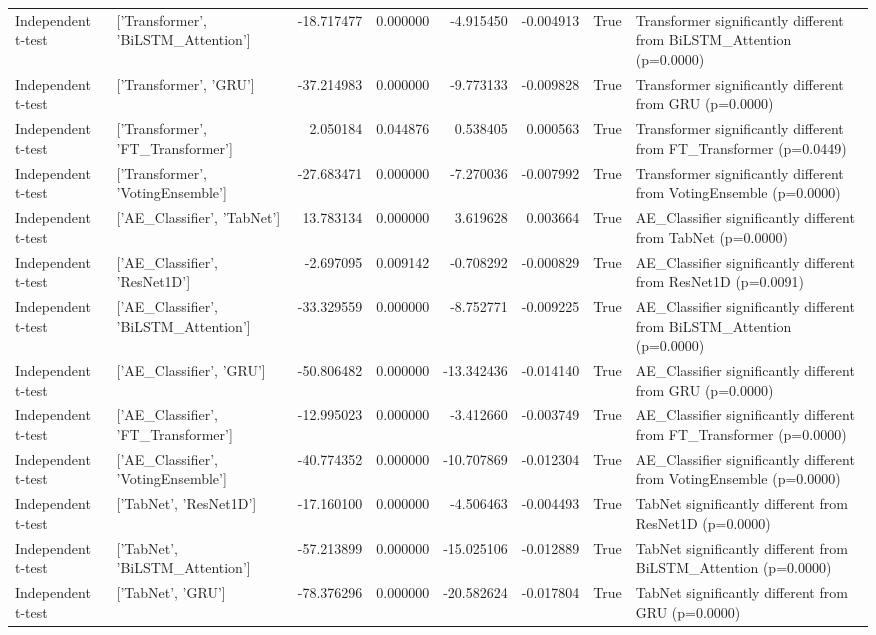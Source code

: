 \begin{table}
\begin{tabular}{llrrrrrl}
Independent t-test & ['Transformer', 'BiLSTM_Attention'] & -18.717477 & 0.000000 & -4.915450 & -0.004913 & True & Transformer significantly different from BiLSTM_Attention (p=0.0000) \\
Independent t-test & ['Transformer', 'GRU'] & -37.214983 & 0.000000 & -9.773133 & -0.009828 & True & Transformer significantly different from GRU (p=0.0000) \\
Independent t-test & ['Transformer', 'FT_Transformer'] & 2.050184 & 0.044876 & 0.538405 & 0.000563 & True & Transformer significantly different from FT_Transformer (p=0.0449) \\
Independent t-test & ['Transformer', 'VotingEnsemble'] & -27.683471 & 0.000000 & -7.270036 & -0.007992 & True & Transformer significantly different from VotingEnsemble (p=0.0000) \\
Independent t-test & ['AE_Classifier', 'TabNet'] & 13.783134 & 0.000000 & 3.619628 & 0.003664 & True & AE_Classifier significantly different from TabNet (p=0.0000) \\
Independent t-test & ['AE_Classifier', 'ResNet1D'] & -2.697095 & 0.009142 & -0.708292 & -0.000829 & True & AE_Classifier significantly different from ResNet1D (p=0.0091) \\
Independent t-test & ['AE_Classifier', 'BiLSTM_Attention'] & -33.329559 & 0.000000 & -8.752771 & -0.009225 & True & AE_Classifier significantly different from BiLSTM_Attention (p=0.0000) \\
Independent t-test & ['AE_Classifier', 'GRU'] & -50.806482 & 0.000000 & -13.342436 & -0.014140 & True & AE_Classifier significantly different from GRU (p=0.0000) \\
Independent t-test & ['AE_Classifier', 'FT_Transformer'] & -12.995023 & 0.000000 & -3.412660 & -0.003749 & True & AE_Classifier significantly different from FT_Transformer (p=0.0000) \\
Independent t-test & ['AE_Classifier', 'VotingEnsemble'] & -40.774352 & 0.000000 & -10.707869 & -0.012304 & True & AE_Classifier significantly different from VotingEnsemble (p=0.0000) \\
Independent t-test & ['TabNet', 'ResNet1D'] & -17.160100 & 0.000000 & -4.506463 & -0.004493 & True & TabNet significantly different from ResNet1D (p=0.0000) \\
Independent t-test & ['TabNet', 'BiLSTM_Attention'] & -57.213899 & 0.000000 & -15.025106 & -0.012889 & True & TabNet significantly different from BiLSTM_Attention (p=0.0000) \\
Independent t-test & ['TabNet', 'GRU'] & -78.376296 & 0.000000 & -20.582624 & -0.017804 & True & TabNet significantly different from GRU (p=0.0000) \\

\end{tabular}
\end{table}
